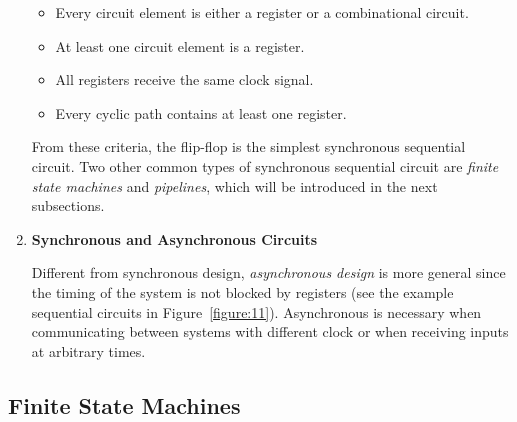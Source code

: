 \documentclass[12pt]{article}
\begin{document}
\begin{enumerate}
  \begin{itemize}
    \item Every circuit element is either a register or a combinational circuit.
    \item At least one circuit element is a register.
    \item All registers receive the same clock signal.
    \item Every cyclic path contains at least one register.
  \end{itemize}

  From these criteria, the flip-flop is the simplest synchronous sequential circuit. Two other common types of synchronous sequential circuit are \textit{finite state machines} and \textit{pipelines}, which will be introduced in the next subsections.

  \item \textbf{Synchronous and Asynchronous Circuits}

  Different from synchronous design, \textit{asynchronous design} is more general since the timing of the system is not blocked by registers (see the example sequential circuits in Figure~\ref{figure:11}). Asynchronous is necessary when communicating between systems with different clock or when receiving inputs at arbitrary times.
\end{enumerate}

\subsection{Finite State Machines}
\end{document}

